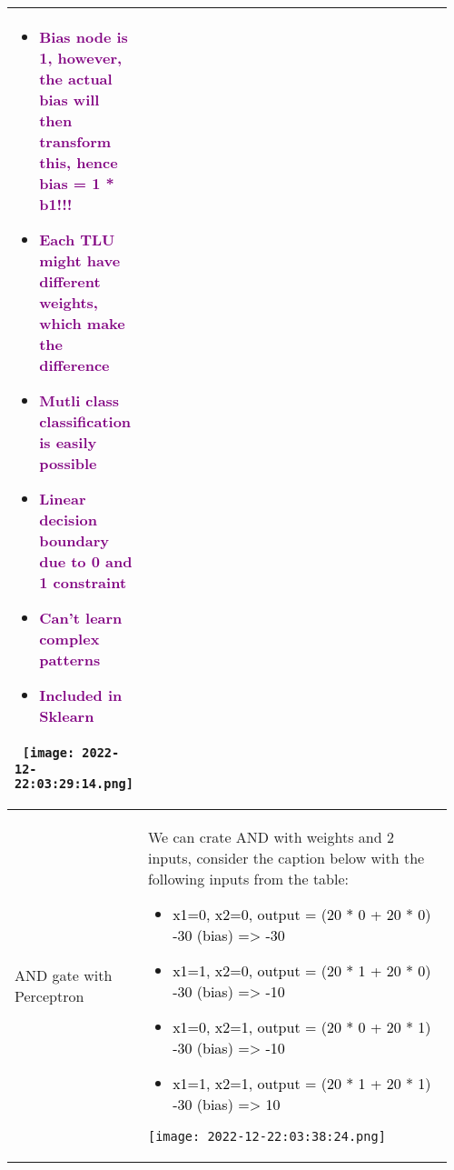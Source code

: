 \documentclass[main.tex,fontsize=8pt,paper=a4,paper=portrait,DIV=calc,]{scrartcl}
\begin{document}
\begin{table}[ht!]
\begin{tabular}{|m{0.2\linewidth}|m{0.755\linewidth}|}
\begin{itemize}
\item \textcolor{purple}{Bias node is 1, however, the actual bias will then transform this, hence bias = 1 * b1!!!}
\item \textcolor{purple}{Each TLU might have different weights, which make the difference}
\item \textcolor{purple}{Mutli class classification is easily possible}
\item \textcolor{purple}{Linear decision boundary due to 0 and 1 constraint}
\item \textcolor{purple}{Can't learn complex patterns}
\item \textcolor{purple}{Included in Sklearn}
\end{itemize} 
\, \newline
\texttt{[image: 2022-12-22:03:29:14.png]}
\\
\hline
AND gate with Perceptron & 
We can crate AND with weights and 2 inputs, consider the caption below with the following inputs from the table:\newline
\begin{itemize}
\item \textcolor{black}{x1=0, x2=0, output = (20 * 0 + 20 * 0) -30 (bias) => -30}
\item \textcolor{black}{x1=1, x2=0, output = (20 * 1 + 20 * 0) -30 (bias) => -10}
\item \textcolor{black}{x1=0, x2=1, output = (20 * 0 + 20 * 1) -30 (bias) => -10}
\item \textcolor{black}{x1=1, x2=1, output = (20 * 1 + 20 * 1) -30 (bias) => 10}
\end{itemize} 
\texttt{[image: 2022-12-22:03:38:24.png]}
\\
\hline
\end{tabular}
\end{table}
\pagebreak
\end{document}

